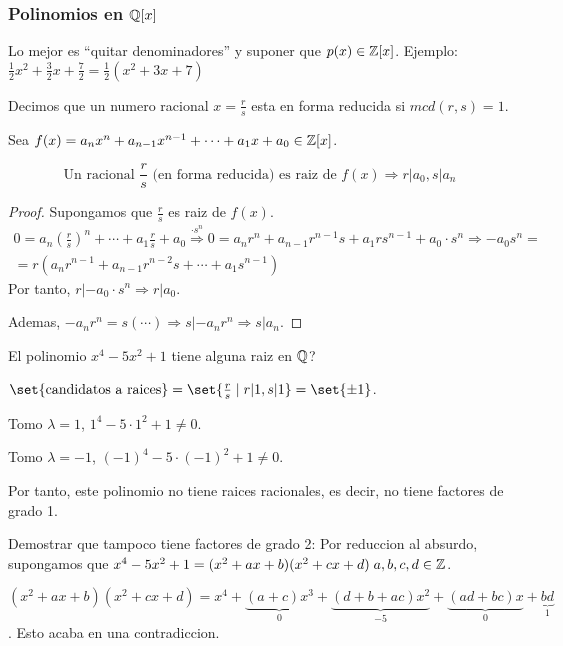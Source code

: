 \subsubsection{Polinomios en \(\mathbb{Q}[x ]\)}
\begin{remark}
	Lo mejor es ``quitar denominadores'' y suponer que \(p(x) \in \mathbb{Z}[x ]\). Ejemplo: \(\frac{1}{2}x^{2} + \frac{3}{2}x + \frac{7}{2} = \frac{1}{2} (x^{2} + 3x + 7 ) \)
\end{remark}
\begin{definition}
	Decimos que un numero racional \(x = \frac{r}{ s }\) esta en forma reducida si \(mcd(r,s) = 1 \).
\end{definition}
\begin{theorem}
	Sea \(f(x) = a_n x^{n} + a_{n-1} x^{n-1} +
	\cdots + a_1 x + a_0 \in \mathbb{Z}[x]  \).
	
	\[
		\text{Un racional } \frac{r}{s} \text{ (en forma reducida) es raiz de }f(x) \Rightarrow r | a_0, s | a_n
	\]
\end{theorem}
\begin{proof}
	Supongamos que \(\frac{r}{s }\) es raiz de \(f(x )\).
	\begin{multline*}
		0 = a_n (\frac{r}{s})^{n} + \cdots + a_1 \frac{r}{s} + a_0 \overset{\cdot s^{n} }{\Rightarrow} 0 = a_n r^{n} + a_{n-1} r^{n-1} s  + a_1 r s^{n-1} + a_0 \cdot s^{n} \Rightarrow -a_0 s^{n} = \\ = r (a_n r^{n-1} + a_{n-1} r^{n-2} s +  \cdots + a_1 s^{n-1}  )
	\end{multline*}
	Por tanto, \(r | -a_0 \cdot s^{n} \Rightarrow r | a_0  \).
	
	Ademas, \(-a_n r^{n} = s( \cdots ) \Rightarrow s | -a_n r^{n} \Rightarrow s | a_n \).
\end{proof}
\begin{example}
	El polinomio \(x^{4} - 5x^{2} + 1 \) tiene alguna raiz en \(\mathbb{Q} \)?
	
	\(\set{\text{candidatos a raices}} = \set{\frac{r}{s} \mid r|1, s|1  } = \set{\pm 1}\).
	
	Tomo \(\lambda = 1 \), \(1^{4} - 5 \cdot 1^{2} + 1 \neq 0  \).
	
	Tomo \(\lambda = -1 \), \((-1)^{4} - 5 \cdot (-1)^{2} + 1  \neq 0\).
	
	Por tanto, este polinomio no tiene raices racionales, es decir, no tiene factores de grado 1.
	
	Demostrar que tampoco tiene factores de grado 2:
	Por reduccion al absurdo, supongamos que \(x^{4} - 5x^{2} + 1 = (x^{2} + ax + b )(x^{2} + cx + d ) \; a,b,c,d \in \mathbb{Z} \).
	
	\((x^{2} + ax + b )(x^{2} + cx + d ) = x^{4} + \underbrace{(a+c)x^{3}}_{0} + \underbrace{(d + b + ac)x^{2}}_{-5} + \underbrace{(ad + bc)x}_{0} + \underbrace{bd}_1    \). Esto acaba en una contradiccion.
\end{example}

